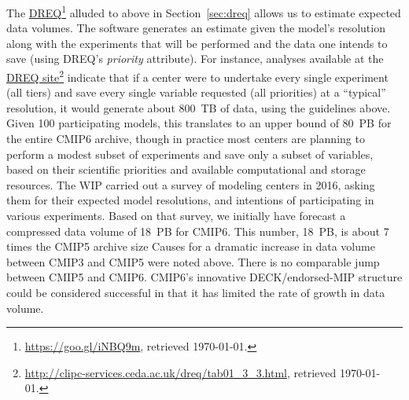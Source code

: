 \documentclass[gmd,manuscript]{copernicus}
\newcommand{\urlref}[2] {\href{#1}{#2}\footnote{\url{#1}, retrieved \today.}}
\begin{document}
The \urlref{https://goo.gl/iNBQ9m}{DREQ} alluded to above in
Section~\ref{sec:dreq} allows us to estimate expected data volumes.  
 The software generates an estimate given the model's
resolution along with the experiments that will be performed and the
data one intends to save (using DREQ's \emph{priority} attribute).
 For instance,
analyses available at the
\urlref{http://clipc-services.ceda.ac.uk/dreq/tab01_3_3.html}{DREQ
  site} indicate that if a center were to undertake every single
experiment (all tiers) and save every single variable requested (all
priorities) at a ``typical'' resolution, it would generate about
800~TB of data, using the guidelines above. Given 100 participating
models, this translates to an upper bound of 80~PB for the entire
CMIP6 archive, though in practice most centers are planning to perform
a modest subset of experiments and save only a subset of variables, based on
their scientific priorities and available computational and storage
resources. The WIP carried out a survey of modeling centers in 2016,
asking them for their expected model resolutions, and intentions of
participating in various experiments. Based on that survey, we
initially have forecast a
compressed data volume of 18~PB for CMIP6. This number, 18~PB, is
about 7 times the CMIP5
 archive
size
Causes for a dramatic increase in data volume between CMIP3 and CMIP5
were noted above. There is no comparable jump between CMIP5 and CMIP6.
CMIP6's innovative DECK/endorsed-MIP structure could be considered 
successful in that it has limited the rate of growth in data volume.  
\end{document}
